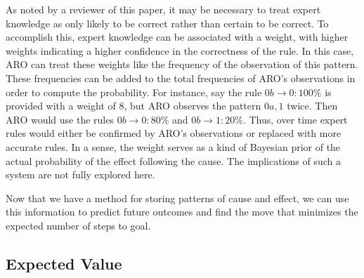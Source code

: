 \documentclass[letterpaper]{article} %
\begin{document}
As noted by a reviewer of this paper, it may be necessary to treat expert
knowledge as only likely to be correct rather than certain to be correct. 
To accomplish this, expert knowledge can be associated with a weight, with 
higher weights indicating a higher confidence in the correctness of the rule. 
In this case, ARO can treat these weights like the frequency of the observation 
of this pattern. These frequencies can be added to the total frequencies of ARO's 
observations in order to compute the probability. For instance, say the rule 
$0b \rightarrow 0: 100\%$ is provided with a weight of $8$, but ARO observes the 
pattern $0a, 1$ twice. Then ARO would use the rules $0b \rightarrow 0: 80\%$ and 
$0b \rightarrow 1: 20\%$. Thus, over time expert rules would either be confirmed by 
ARO's observations or replaced with more accurate rules. In a sense, the weight 
serves as a kind of Bayesian prior of the actual probability of the effect 
following the cause. The implications of such a system are not fully 
explored here.




Now that we have a method for storing patterns of cause and effect, we
can use this information to predict future outcomes and find the
move that minimizes the expected number of steps to goal.

\subsection{Expected Value}
\end{document}
